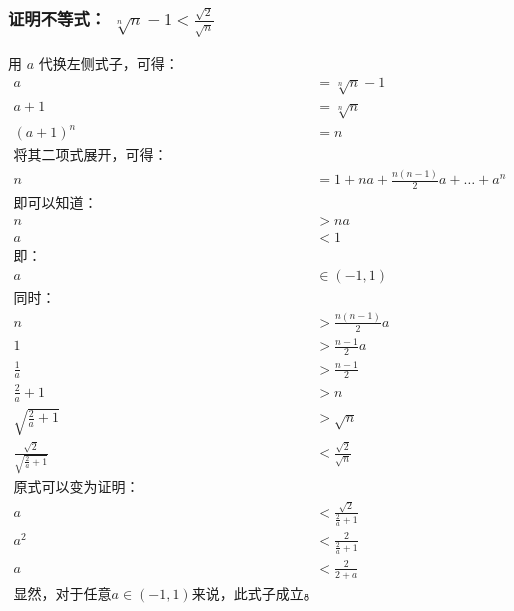 \documentclass{article}
\begin{document}
\subsubsection{证明不等式： $\sqrt[n]{n} - 1 < \frac{\sqrt{2}}{\sqrt{n}}$}
用 $a$ 代换左侧式子，可得：
\begin{align*}
    a &= \sqrt[n]{n} - 1 \\
    a + 1 &= \sqrt[n]{n} \\
    (a + 1)^n &= n \\
    \text{将其二项式展开，可得：} \\
    n &= 1 + na + \frac{n(n-1)}{2}a + \dots + a^n \\
    \text{即可以知道：} \\
    n &> na \\ 
    a &< 1 \\
    \text{即：} \\
    a &\in (-1, 1) \\
    \text{同时：} \\
    n &> \frac{n(n-1)}{2}a \\
    1 &> \frac{n-1}{2}a \\
    \frac{1}{a} &> \frac{n-1}{2} \\
    \frac{2}{a} + 1 &> n \\
    \sqrt{\frac{2}{a} + 1} &> \sqrt{n} \\
    \frac{\sqrt{2}}{\sqrt{\frac{2}{a} + 1}} &< \frac{\sqrt{2}}{\sqrt{n}} \\
    \text{原式可以变为证明：} \\
    a &< \frac{\sqrt{2}}{\frac{2}{a} + 1} \\
    a^2 &< \frac{2}{\frac{2}{a} + 1} \\
    a &< \frac{2}{2 + a} \\
    \text{显然，对于任意$a \in (-1, 1)$来说，此式子成立。 } \square
\end{align*}
\end{document}
